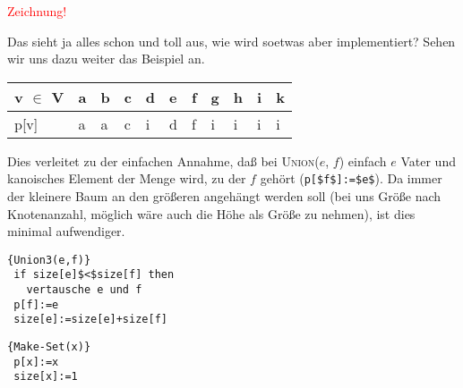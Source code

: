 \documentclass[ngerman,draft,parskip=half*,twoside]{scrreprt}
\theoremstyle{break}
\begin{document}
\textcolor{red}{Zeichnung!}

Das sieht ja alles schon und toll aus, wie wird soetwas aber implementiert? Sehen wir uns dazu weiter das Beispiel an.

\begin{tabular}{l|llllllllll}
v $\in$ V & a & b & c & d & e & f & g & h & i & k\\
\hline
p[v] & a & a & c & i & d & f & i & i & i & i\\
\end{tabular}

Dies verleitet zu der einfachen Annahme, daß bei \textsc{Union}($e$, $f$) einfach $e$ Vater und kanoisches Element der
Menge wird, zu der $f$ gehört (\lstinline[mathescape=true]!p[$f$]:=$e$!). Da immer der kleinere Baum an den größeren
angehängt werden soll (bei uns Größe nach Knotenanzahl, möglich wäre auch die Höhe als Größe zu nehmen), ist
dies minimal aufwendiger.

\begin{Algorithmus}[H]
\begin{lstlisting}[frame=tlrb, mathescape=true, title=\textsc{Union\textnormal{(e, f)}},gobble=1]{Union3(e,f)}
 if size[e]$<$size[f] then
   vertausche e und f
 p[f]:=e
 size[e]:=size[e]+size[f]  
\end{lstlisting}
\end{Algorithmus} 

\begin{Algorithmus}[H]
\begin{lstlisting}[frame=tlrb, mathescape=true, title=\textsc{Make-Set\textnormal{(x)}},gobble=1]{Make-Set(x)}
 p[x]:=x
 size[x]:=1  
\end{lstlisting}
\end{Algorithmus} 
\end{document}
